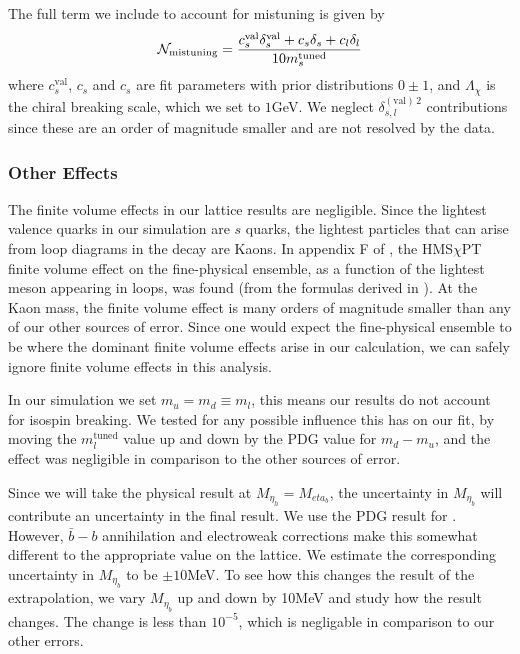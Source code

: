The full term we include to account for mistuning is given by
\begin{align}
  \mathcal{N}_{\text{mistuning}} = {c^{\text{val}}_s \delta^{\text{val}}_s + c_s \delta_s + c_l \delta_l \over 10 m_s^{\text{tuned}}}
  \label{eq:mistuning}
\end{align}
where $c_s^{\text{val}}$, $c_s$ and $c_s$ are fit parameters with prior distributions $0\pm 1$, and $\Lambda_{\chi}$ is the chiral breaking scale, which we set to $1$GeV. We neglect $\delta^{(\text{val})\,2}_{s,l}$ contributions since these are an order of magnitude smaller and are not resolved by the data.

\subsubsection{Other Effects}

The finite volume effects in our lattice results are negligible. Since the lightest valence quarks in our simulation are $s$ quarks, the lightest particles that can arise from loop diagrams in the decay are Kaons. In appendix F of \cite{Harrison:2017fmw}, the HMS$\chi$PT finite volume effect on the fine-physical ensemble, as a function of the lightest meson appearing in loops, was found (from the formulas derived in \cite{Laiho:2005ue}). At the Kaon mass, the finite volume effect is many orders of magnitude smaller than any of our other sources of error. Since one would expect the fine-physical ensemble to be where the dominant finite volume effects arise in our calculation, we can safely ignore finite volume effects in this analysis.

In our simulation we set $m_u=m_d\equiv m_l$, this means our results do not account for isospin breaking. We tested for any possible influence this has on our fit, by moving the $m_l^{\text{tuned}}$ value up and down by the PDG value for $m_d-m_u$, and the effect was negligible in comparison to the other sources of error.

Since we will take the physical result at $M_{\eta_h}=M_{eta_b}$, the uncertainty in $M_{\eta_b}$ will contribute an uncertainty in the final result. We use the PDG result for \cite{PhysRevD.98.030001}. However, $\bar{b}-b$ annihilation and electroweak corrections make this somewhat different to the appropriate value on the lattice. We estimate the corresponding uncertainty in $M_{\eta_b}$ to be $\pm10$MeV. To see how this changes the result of the extrapolation, we vary $M_{\eta_b}$ up and down by 10MeV and study how the result changes. The change is less than $10^{-5}$, which is negligable in comparison to our other errors.

